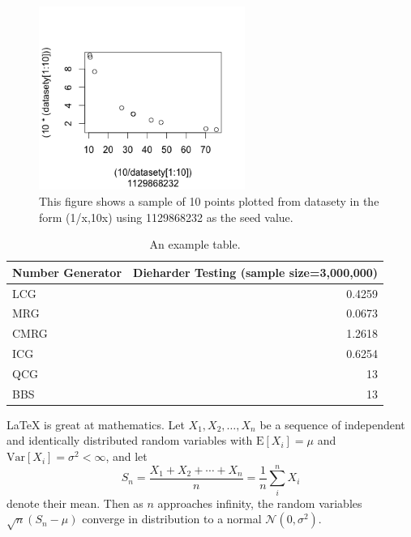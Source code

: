 \documentclass[a4paper]{article}
\begin{document}
\begin{figure}
\centering
\includegraphics[width=0.60\textwidth]{Rplot1.png}
\caption{\label{fig:Rplot1}This figure shows a sample of 10 points plotted from datasety in the form (1/x,10x) using 1129868232 as the seed value.}
\end{figure}

\begin{table}
\centering
\begin{tabular}{l|r}
Number Generator & Dieharder Testing (sample size=3,000,000) \\\hline
LCG & 0.4259 \\
MRG & 0.0673 \\
CMRG & 1.2618 \\
ICG & 0.6254 \\
QCG & 13 \\
BBS & 13 \\
\end{tabular}
\caption{\label{tab:widgets}An example table.}
\end{table}

\LaTeX{} is great at mathematics. Let $X_1, X_2, \ldots, X_n$ be a sequence of independent and identically distributed random variables with $\text{E}[X_i] = \mu$ and $\text{Var}[X_i] = \sigma^2 < \infty$, and let
$$S_n = \frac{X_1 + X_2 + \cdots + X_n}{n}
      = \frac{1}{n}\sum_{i}^{n} X_i$$
denote their mean. Then as $n$ approaches infinity, the random variables $\sqrt{n}(S_n - \mu)$ converge in distribution to a normal $\mathcal{N}(0, \sigma^2)$.


\end{document}
